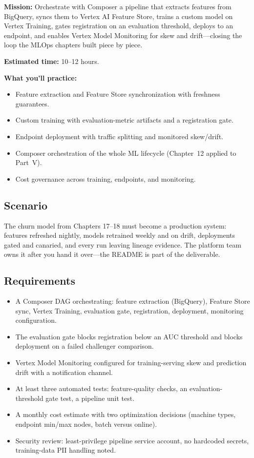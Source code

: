 \begin{capstonebox}
\textbf{Mission:} Orchestrate with Composer a pipeline that extracts features from BigQuery, syncs them to Vertex AI Feature Store, trains a custom model on Vertex Training, gates registration on an evaluation threshold, deploys to an endpoint, and enables Vertex Model Monitoring for skew and drift---closing the loop the MLOps chapters built piece by piece.

\textbf{Estimated time:} 10--12 hours.

\textbf{What you'll practice:}
\begin{itemize}
    \item Feature extraction and Feature Store synchronization with freshness guarantees.
    \item Custom training with evaluation-metric artifacts and a registration gate.
    \item Endpoint deployment with traffic splitting and monitored skew/drift.
    \item Composer orchestration of the whole ML lifecycle (Chapter~12 applied to Part~V).
    \item Cost governance across training, endpoints, and monitoring.
\end{itemize}
\end{capstonebox}

\subsection*{Scenario}
The churn model from Chapters 17--18 must become a production system: features refreshed nightly, models retrained weekly and on drift, deployments gated and canaried, and every run leaving lineage evidence. The platform team owns it after you hand it over---the README is part of the deliverable.

\subsection*{Requirements}
\begin{itemize}
    \item A Composer DAG orchestrating: feature extraction (BigQuery), Feature Store sync, Vertex Training, evaluation gate, registration, deployment, monitoring configuration.
    \item The evaluation gate blocks registration below an AUC threshold and blocks deployment on a failed challenger comparison.
    \item Vertex Model Monitoring configured for training-serving skew and prediction drift with a notification channel.
    \item At least three automated tests: feature-quality checks, an evaluation-threshold gate test, a pipeline unit test.
    \item A monthly cost estimate with two optimization decisions (machine types, endpoint min/max nodes, batch versus online).
    \item Security review: least-privilege pipeline service account, no hardcoded secrets, training-data PII handling noted.
\end{itemize}

